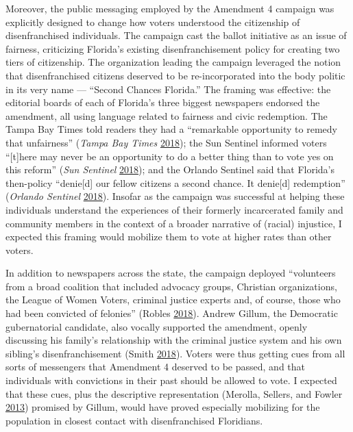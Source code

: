 \documentclass[
  12pt,
]{article}
\begin{document}
Moreover, the public messaging employed by the Amendment 4 campaign was explicitly designed to change how voters understood the citizenship of disenfranchised individuals. The campaign cast the ballot initiative as an issue of fairness, criticizing Florida's existing disenfranchisement policy for creating two tiers of citizenship. The organization leading the campaign leveraged the notion that disenfranchised citizens deserved to be re-incorporated into the body politic in its very name --- ``Second Chances Florida.'' The framing was effective: the editorial boards of each of Florida's three biggest newspapers endorsed the amendment, all using language related to fairness and civic redemption. The Tampa Bay Times told readers they had a ``remarkable opportunity to remedy that unfairness'' (\emph{Tampa Bay Times} \protect\hyperlink{ref-tampabaytimes2018}{2018}); the Sun Sentinel informed voters ``{[}t{]}here may never be an opportunity to do a better thing than to vote yes on this reform'' (\emph{Sun Sentinel} \protect\hyperlink{ref-SunSentinelEditorial2018}{2018}); and the Orlando Sentinel said that Florida's then-policy ``denie{[}d{]} our fellow citizens a second chance. It denie{[}d{]} redemption'' (\emph{Orlando Sentinel} \protect\hyperlink{ref-ORLANDOSENTINEL2018}{2018}). Insofar as the campaign was successful at helping these individuals understand the experiences of their formerly incarcerated family and community members in the context of a broader narrative of (racial) injustice, I expected this framing would mobilize them to vote at higher rates than other voters.

In addition to newspapers across the state, the campaign deployed ``volunteers from a broad coalition that included advocacy groups, Christian organizations, the League of Women Voters, criminal justice experts and, of course, those who had been convicted of felonies'' (Robles \protect\hyperlink{ref-Robles2018}{2018}). Andrew Gillum, the Democratic gubernatorial candidate, also vocally supported the amendment, openly discussing his family's relationship with the criminal justice system and his own sibling's disenfranchisement (Smith \protect\hyperlink{ref-Smith2018}{2018}). Voters were thus getting cues from all sorts of messengers that Amendment 4 deserved to be passed, and that individuals with convictions in their past should be allowed to vote. I expected that these cues, plus the descriptive representation (Merolla, Sellers, and Fowler \protect\hyperlink{ref-Merolla2013}{2013}) promised by Gillum, would have proved especially mobilizing for the population in closest contact with disenfranchised Floridians.
\end{document}
